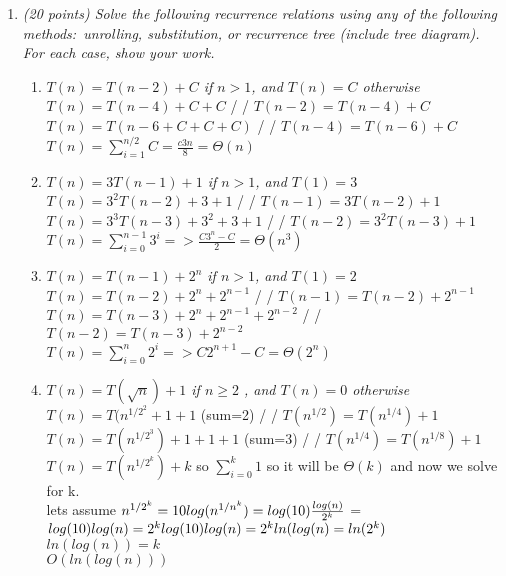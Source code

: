 \documentclass[12pt]{article}
\begin{document}
\begin{enumerate}
    \item\textit{ (20 points) Solve the following recurrence relations using any of the following methods:\ unrolling, substitution, or recurrence tree (include tree diagram). For each case, show your work.}
    \begin{enumerate}
    	\item\textit{ $T(n) = T(n-2) + C$ if $n>1$, and $T(n) = C$ otherwise}\\
	$T(n) = T(n-4) + C+C$	  / /  $T(n-2)=T(n-4) + C$\\
	$T(n) = T(n-6 + C + C + C)$	 / /  $T(n-4)=T(n-6) + C$\\
	$T(n) = \sum_{i=1}^{n/2} C =  \frac{c3n}{8}  =  \Theta(n)$ 
		\\
    	\item\textit{ $T(n) = 3T(n-1) + 1$ if $n>1$, and $T(1) = 3$}\\
	$T(n)=3^2T(n-2)+3+1$  / /  $T(n-1)=3T(n-2)+1$\\
	$T(n)=3^3T(n-3)+3^2+3+1$  / /  $T(n-2)=3^2T(n-3)+1$\\
	$T(n)= \sum_{i=0}^{n-1}3^i => \frac{C3^n-C}{2} = \Theta(n^3)$ 
    	\item\textit{ $T(n) = T(n-1)+2^{n}$ if $n>1$, and $T(1) = 2$}\\
	$T(n) = T(n-2) + 2^n + 2^{n-1}$  / /   $T(n-1) = T(n-2) + 2^{n-1}$
	$T(n) = T(n-3) + 2^n + 2^{n-1} + 2^{n-2}$  / /   $T(n-2) = T(n-3) + 2^{n-2}$
	$T(n)= \sum_{i=0}^{n}2^i => C2^{n+1}-C = \Theta(2^n)$
    	\item\textit{ $T(n) = T(\sqrt{n}) + 1$ if $n\geq2$ , and $T(n) = 0$ otherwise}\\
	$T(n) = T(n^{1/2^2} + 1 + 1$ (sum=2)  / /   $T(n^{1/2}) = T(n^{1/4}) + 1$\\
	$T(n) = T(n^{1/2^3}) + 1 + 1 + 1$ (sum=3)  / /  $T(n^{1/4}) = T(n^{1/8}) + 1$\\
	$T(n) = T(n^{1/2^k}) + k$ so $\sum_{i=0}^{k}1$ so it will be $\Theta(k)$ and now we solve for k.\\
	lets assume $n^{1/2^k} = 10 \\ log(n^{1/n^k}) = log(10) \\ \frac{log(n)}{2^k}$ = $ log(10) \\ log(n) = 2^klog(10) \\
	log(n) = 2^k \\ ln(log(n) = ln(2^k)$\\
 	$ln(log(n)) = k$ \\ $O(ln(log(n)))$

    \end{enumerate}


\end{enumerate}
\end{document}
